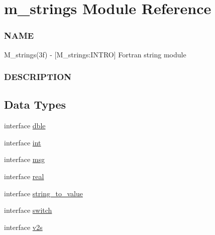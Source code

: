 \hypertarget{namespacem__strings}{}\section{m\+\_\+strings Module Reference}
\label{namespacem__strings}


\subsubsection*{N\+A\+ME}

M\+\_\+strings(3f) -\/ \mbox{[}M\+\_\+strings\+:I\+N\+T\+RO\mbox{]} Fortran string module \subsubsection*{D\+E\+S\+C\+R\+I\+P\+T\+I\+ON} 


\subsection*{Data Types}
\begin{DoxyCompactItemize}
\item 
interface \mbox{\hyperlink{interfacem__strings_1_1dble}{dble}}
\item 
interface \mbox{\hyperlink{interfacem__strings_1_1int}{int}}
\item 
interface \mbox{\hyperlink{interfacem__strings_1_1msg}{msg}}
\item 
interface \mbox{\hyperlink{interfacem__strings_1_1real}{real}}
\item 
interface \mbox{\hyperlink{interfacem__strings_1_1string__to__value}{string\+\_\+to\+\_\+value}}
\item 
interface \mbox{\hyperlink{interfacem__strings_1_1switch}{switch}}
\item 
interface \mbox{\hyperlink{interfacem__strings_1_1v2s}{v2s}}
\end{DoxyCompactItemize}
